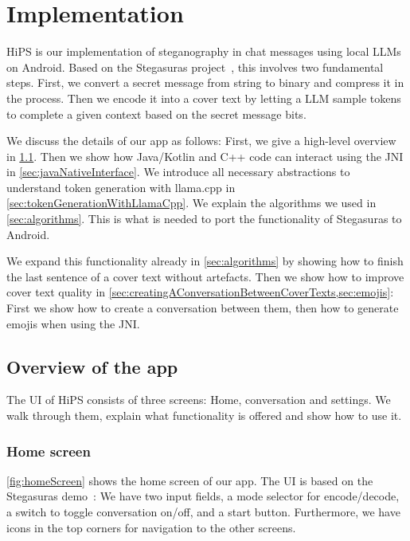 
\chapter{Implementation}\label{ch:implementation}
\glsresetall %

\gls{HiPS} is our implementation of steganography in chat messages using local \glspl{LLM} on Android. Based on the Stegasuras project~\cite{zieglerNeuralLinguisticSteganography2019}, this involves two fundamental steps. First, we convert a secret message from string to binary and compress it in the process. Then we encode it into a cover text by letting a \gls{LLM} sample tokens to complete a given context based on the secret message bits.

We discuss the details of our app as follows: First, we give a high-level overview in \cref{sec:overviewOfTheApp}. Then we show how Java/Kotlin and C++ code can interact using the \gls{JNI} in \cref{sec:javaNativeInterface}. We introduce all necessary abstractions to understand token generation with llama.cpp in \cref{sec:tokenGenerationWithLlamaCpp}. We explain the algorithms we used in \cref{sec:algorithms}. This is what is needed to port the functionality of Stegasuras to Android.

We expand this functionality already in \cref{sec:algorithms} by showing how to finish the last sentence of a cover text without artefacts. Then we show how to improve cover text quality in \cref{sec:creatingAConversationBetweenCoverTexts,sec:emojis}: First we show how to create a conversation between them, then how to generate emojis when using the \gls{JNI}.

\section{Overview of the app}
\label{sec:overviewOfTheApp}
The \gls{UI} of \gls{HiPS} consists of three screens: Home, conversation and settings. We walk through them, explain what functionality is offered and show how to use it.

\subsection{Home screen}
\label{sec:homeScreen}
\cref{fig:homeScreen} shows the home screen of our app. The \gls{UI} is based on the Stegasuras demo~\cite{zieglerStegasuras2025}: We have two input fields, a mode selector for encode/decode, a switch to toggle conversation on/off, and a start button. Furthermore, we have icons in the top corners for navigation to the other screens.

